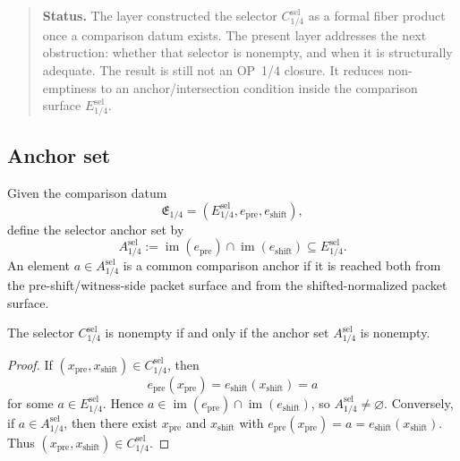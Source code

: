 \begin{quote}\small
\noindent\textbf{Status.}
The layer constructed the selector \(C_{1/4}^{\mathrm{sel}}\) as a formal
fiber product once a comparison datum exists. The present layer addresses
the next obstruction: whether that selector is nonempty, and when it is
structurally adequate. The result is still not an OP~1/4 closure. It reduces
non-emptiness to an anchor/intersection condition inside the comparison surface
\(E_{1/4}^{\mathrm{sel}}\).
\end{quote}

\subsection{Anchor set}
\label{subsec:v410r08-anchor-set}

\begin{definition}
\label{def:v410r08-op14-selector-anchor-set}
Given the comparison datum
\[
 \mathfrak E_{1/4}
 =
 (E_{1/4}^{\mathrm{sel}},e_{\mathrm{pre}},e_{\mathrm{shift}}),
\]
define the selector anchor set by
\[
 A_{1/4}^{\mathrm{sel}}
 :=
 \operatorname{im}(e_{\mathrm{pre}})
 \cap
 \operatorname{im}(e_{\mathrm{shift}})
 \subseteq
 E_{1/4}^{\mathrm{sel}}.
\]
An element \(a\in A_{1/4}^{\mathrm{sel}}\) is a common comparison anchor if it
is reached both from the pre-shift/witness-side packet surface and from the
shifted-normalized packet surface.
\end{definition}

\begin{lemma}
\label{lem:v410r08-nonempty-criterion}
The selector \(C_{1/4}^{\mathrm{sel}}\) is nonempty if and only if the anchor
set \(A_{1/4}^{\mathrm{sel}}\) is nonempty.
\end{lemma}

\begin{proof}
If \((x_{\mathrm{pre}},x_{\mathrm{shift}})\in C_{1/4}^{\mathrm{sel}}\), then
\[
 e_{\mathrm{pre}}(x_{\mathrm{pre}})
 =
 e_{\mathrm{shift}}(x_{\mathrm{shift}})=a
\]
for some \(a\in E_{1/4}^{\mathrm{sel}}\). Hence
\(a\in\operatorname{im}(e_{\mathrm{pre}})\cap\operatorname{im}(e_{\mathrm{shift}})\),
so \(A_{1/4}^{\mathrm{sel}}\neq\varnothing\). Conversely, if
\(a\in A_{1/4}^{\mathrm{sel}}\), then there exist
\(x_{\mathrm{pre}}\) and \(x_{\mathrm{shift}}\) with
\(e_{\mathrm{pre}}(x_{\mathrm{pre}})=a=e_{\mathrm{shift}}(x_{\mathrm{shift}})\).
Thus \((x_{\mathrm{pre}},x_{\mathrm{shift}})\in C_{1/4}^{\mathrm{sel}}\).
\end{proof}

